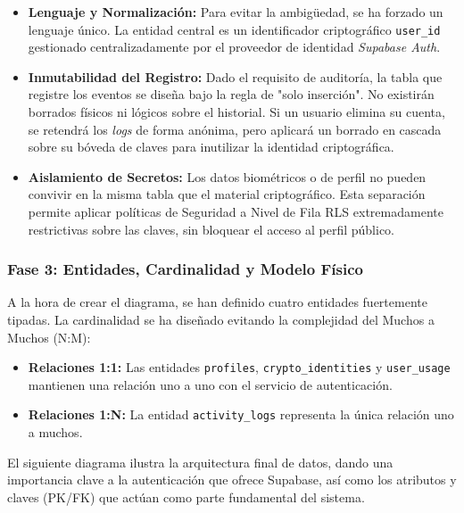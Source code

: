 \documentclass[11pt, a4paper]{report}
\theoremstyle{definition}
\begin{document}
\begin{itemize}
    \item \textbf{Lenguaje y Normalización:} Para evitar la ambigüedad, se ha forzado un lenguaje único. La entidad central es un identificador criptográfico \texttt{user\_id} gestionado centralizadamente por el proveedor de identidad \textit{Supabase Auth}.
    \item \textbf{Inmutabilidad del Registro:} Dado el requisito de auditoría, la tabla que registre los eventos se diseña bajo la regla de "solo inserción". No existirán borrados físicos ni lógicos sobre el historial. Si un usuario elimina su cuenta, se retendrá los \textit{logs} de forma anónima, pero aplicará un borrado en cascada sobre su bóveda de claves para inutilizar la identidad criptográfica.
    \item \textbf{Aislamiento de Secretos:} Los datos biométricos o de perfil no pueden convivir en la misma tabla que el material criptográfico. Esta separación permite aplicar políticas de Seguridad a Nivel de Fila RLS extremadamente restrictivas sobre las claves, sin bloquear el acceso al perfil público.
\end{itemize}

\subsubsection{Fase 3: Entidades, Cardinalidad y Modelo Físico}

A la hora de crear el diagrama, se han definido cuatro entidades fuertemente tipadas. La cardinalidad se ha diseñado evitando la complejidad del Muchos a Muchos (N:M):

\begin{itemize}
    \item \textbf{Relaciones 1:1:} Las entidades \texttt{profiles}, \texttt{crypto\_identities} y \texttt{user\_usage} mantienen una relación uno a uno con el servicio de autenticación.
    \item \textbf{Relaciones 1:N:} La entidad \texttt{activity\_logs} representa la única relación uno a muchos.
\end{itemize}

El siguiente diagrama ilustra la arquitectura final de datos, dando una importancia clave a la autenticación que ofrece Supabase, así como los atributos y claves (PK/FK) que actúan como parte fundamental del sistema.
\end{document}
